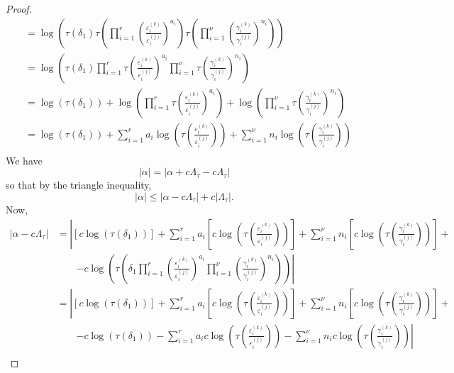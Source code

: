 \begin{proof}
\begin{align*}
	& = \log\left(\tau\left(\delta_1\right) \tau\left(\prod_{i = 1}^r\left( \frac{\varepsilon_i^{(k)}}{\varepsilon_i^{(j)}}\right)^{a_i}\right)\tau\left(\prod_{i = 1}^{\nu} \left( \frac{\gamma_i^{(k)}}{\gamma_i^{(j)}}\right)^{n_i}\right)\right)\\
	& = \log\left(\tau\left(\delta_1\right) \prod_{i = 1}^r\tau\left( \frac{\varepsilon_i^{(k)}}{\varepsilon_i^{(j)}}\right)^{a_i}\prod_{i = 1}^{\nu} \tau\left( \frac{\gamma_i^{(k)}}{\gamma_i^{(j)}}\right)^{n_i}\right)\\
	& = \log\left(\tau\left(\delta_1\right)\right) +\log\left(\prod_{i = 1}^r\tau\left( \frac{\varepsilon_i^{(k)}}{\varepsilon_i^{(j)}}\right)^{a_i} \right) + \log \left(\prod_{i = 1}^{\nu} \tau\left( \frac{\gamma_i^{(k)}}{\gamma_i^{(j)}}\right)^{n_i} \right)\\
	& = \log\left(\tau\left(\delta_1\right)\right) + \sum_{i=1}^r a_i\log\left(\tau\left( \frac{\varepsilon_i^{(k)}}{\varepsilon_i^{(j)}}\right) \right) + \sum_{i=1}^{\nu}n_i\log \left(\tau\left( \frac{\gamma_i^{(k)}}{\gamma_i^{(j)}}\right)\right)\\
\end{align*}
We have
\[|\alpha| = |\alpha + c\Lambda_{\tau} - c\Lambda_{\tau}|\] 
so that by the triangle inequality, 
\[|\alpha| \leq |\alpha - c\Lambda_{\tau}| + c|\Lambda_{\tau}|.\]
Now, 
\begin{align*}
|\alpha-c\Lambda_\tau|
	& = \left|[c\log(\tau(\delta_1))] +\sum_{i = 1}^r a_i \left[c\log\left(\tau\left(\frac{\varepsilon_i^{(k)}}{\varepsilon_i^{(j)}}\right)\right)\right] + \sum_{i = 1}^{\nu} n_i \left[c\log\left(\tau\left(\frac{\gamma_i^{(k)}}{\gamma_i^{(j)}}\right)\right)\right]\right. +\\
	& \quad \quad \left. - c \log\left(\tau\left(\delta_1 \prod_{i = 1}^r\left( \frac{\varepsilon_i^{(k)}}{\varepsilon_i^{(j)}}\right)^{a_i}\prod_{i = 1}^{\nu} \left( \frac{\gamma_i^{(k)}}{\gamma_i^{(j)}}\right)^{n_i}\right)\right)\right|\\
	& = \left|[c\log(\tau(\delta_1))] +\sum_{i = 1}^r a_i \left[c\log\left(\tau\left(\frac{\varepsilon_i^{(k)}}{\varepsilon_i^{(j)}}\right)\right)\right] + \sum_{i = 1}^{\nu} n_i \left[c\log\left(\tau\left(\frac{\gamma_i^{(k)}}{\gamma_i^{(j)}}\right)\right)\right]\right. +\\
	& \quad \quad \left. - c\log\left(\tau\left(\delta_1\right)\right) - \sum_{i=1}^r a_i c\log\left(\tau\left( \frac{\varepsilon_i^{(k)}}{\varepsilon_i^{(j)}}\right) \right) - \sum_{i=1}^{\nu} n_i c\log \left(\tau\left( \frac{\gamma_i^{(k)}}{\gamma_i^{(j)}}\right)\right)\right|\\

\end{align*}
\end{proof}
